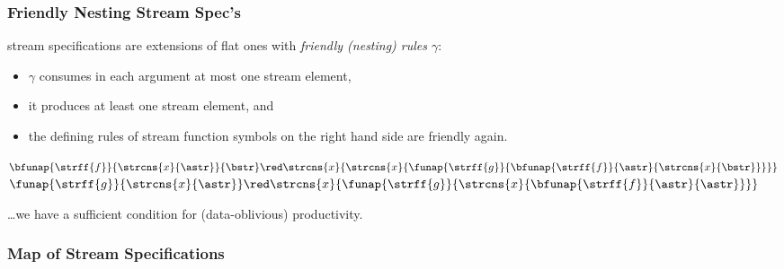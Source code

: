 \documentclass[10pt]{beamer}
\begin{document}
\begin{frame}%
  \frametitle{Friendly Nesting Stream Spec's}

 stream specifications are extensions
of flat ones with \emph{friendly (nesting) rules $\gamma$}:
%
\begin{itemize}
  \item $\gamma$ consumes in each argument at most one stream element,
  \item it produces at least one stream element, and
  \item the defining rules of stream function symbols on the right hand side are friendly again.
\end{itemize}

\begin{example}
\vspace{-1ex}
\begin{center}
  $\bfunap{\strff{f}}{\strcns{x}{\astr}}{\bstr} \red 
   \strcns{x}{\strcns{x}{\funap{\strff{g}}{\bfunap{\strff{f}}{\astr}{\strcns{x}{\bstr}}}}}$ \\[0.5ex]
  $\funap{\strff{g}}{\strcns{x}{\astr}} \red
   \strcns{x}{\funap{\strff{g}}{\strcns{x}{\bfunap{\strff{f}}{\astr}{\astr}}}}$
\end{center}
\vspace{-1ex}
\end{example}

\begin{theorem}
  \ldots we have a sufficient condition for (data-oblivious) productivity.
\end{theorem}

\end{frame}%


\begin{frame}%
  \frametitle{Map of Stream Specifications}  
    
\begin{center}
  \vspace*{-1ex}
  \hspace*{-2.5ex}
\end{center}

\end{frame}%
\end{document}
